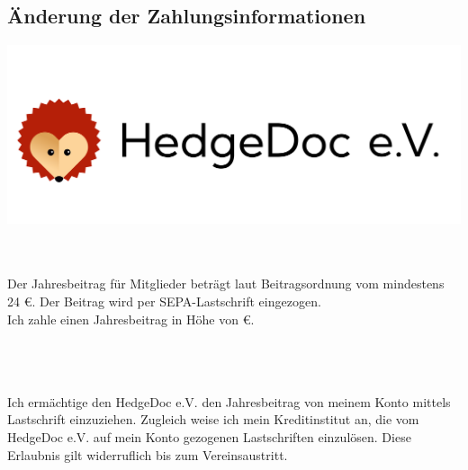\documentclass[paper=a4,twoside=false,DIV=15,fontsize=11pt,parskip=half]{scrartcl}
\begin{document}
\begin{Form}

\begin{minipage}[h]{0.5\textwidth}
  \section*{\huge Änderung der Zahlungsinformationen}
\end{minipage}
\begin{minipage}[h]{0.5\textwidth}
  \hfill
  \includegraphics[width=0.3\paperwidth]{./hedgedoc-ev.pdf}
\end{minipage}

\\[0.5em]
\hfill {}\hfill {}\\[-\baselineskip]

Der Jahresbeitrag für Mitglieder beträgt laut Beitragsordnung vom \datumbeitrago mindestens 24 €. Der Beitrag wird per SEPA-Lastschrift eingezogen.\\[2mm]
Ich zahle einen Jahresbeitrag in Höhe von  €.

\\[2mm]
\\[2mm]
\hfill {}\\[2mm]

Ich ermächtige den HedgeDoc e.V. den Jahresbeitrag von meinem Konto mittels Lastschrift einzuziehen. 
Zugleich weise ich mein Kreditinstitut an, die vom HedgeDoc e.V. auf mein Konto gezogenen Lastschriften einzulösen. 
Diese Erlaubnis gilt widerruflich bis zum Vereinsaustritt.


\end{Form}
\end{document}
